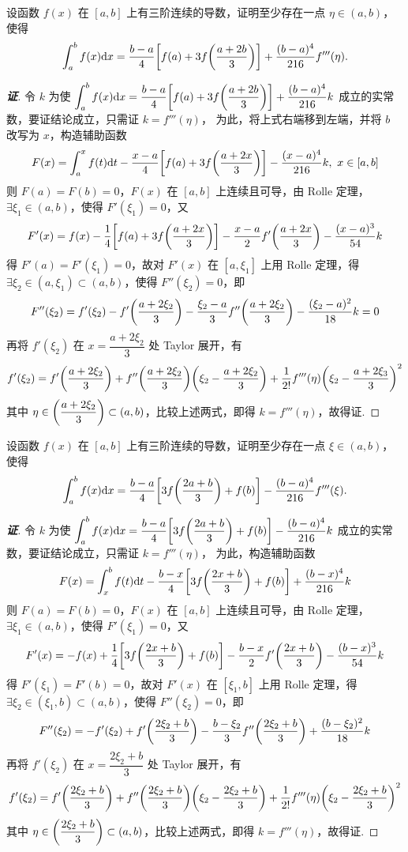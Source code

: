 \begin{example}
    设函数 $f(x)$ 在 $[a,b]$ 上有三阶连续的导数，证明至少存在一点 $\eta\in(a,b)$，使得
    $$\int_{a}^{b}f(x)\dd x=\dfrac{b-a}{4}\qty[f(a)+3f\qty(\dfrac{a+2b}{3})]+\dfrac{(b-a)^4}{216}f'''(\eta).$$
\end{example}
\begin{proof}[{\songti \textbf{证}}]
    令 $k$ 为使 $\displaystyle\int_{a}^{b}f(x)\dd x=\dfrac{b-a}{4}\qty[f(a)+3f\qty(\dfrac{a+2b}{3})]+\dfrac{(b-a)^4}{216}k$ 成立的实常数，要证结论成立，只需证 $k=f'''(\eta)$，
    为此，将上式右端移到左端，并将 $b$ 改写为 $x$，构造辅助函数
    $$F(x)=\int_{a}^{x}f(t)\dd t-\dfrac{x-a}{4}\qty[f(a)+3f\qty(\dfrac{a+2x}{3})]-\dfrac{(x-a)^4}{216}k,~x\in[a,b]$$
    则 $F(a)=F(b)=0$，$F(x)$ 在 $[a,b]$ 上连续且可导，由 Rolle 定理，$\exists\xi_1\in(a,b)$，使得 $F'(\xi_1)=0$，又
    $$F'(x)=f(x)-\dfrac{1}{4}\qty[f(a)+3f\qty(\dfrac{a+2x}{3})]-\dfrac{x-a}{2}f'\qty(\dfrac{a+2x}{3})-\dfrac{(x-a)^3}{54}k$$
    得 $F'(a)=F'(\xi_1)=0$，故对 $F'(x)$ 在 $[a,\xi_1]$ 上用 Rolle 定理，得 $\exists\xi_2\in(a,\xi_1)\subset(a,b)$，使得 $F''(\xi_2)=0$，即
    $$F''(\xi_2)=f'(\xi_2)-f'\qty(\dfrac{a+2\xi_2}{3})-\dfrac{\xi_2-a}{3}f''\qty(\dfrac{a+2\xi_2}{3})-\dfrac{(\xi_2-a)^2}{18}k=0$$
    再将 $f'(\xi_2)$ 在 $x=\dfrac{a+2\xi_2}{3}$ 处 Taylor 展开，有
    $$f'(\xi_2)=f'\qty(\dfrac{a+2\xi_2}{3})+f''\qty(\dfrac{a+2\xi_2}{3})\qty(\xi_2-\dfrac{a+2\xi_2}{3})+\dfrac{1}{2!}f'''(\eta)\qty(\xi_2-\dfrac{a+2\xi_3}{3})^2$$
    其中 $\eta\in\qty(\dfrac{a+2\xi_2}{3})\subset(a,b)$，比较上述两式，即得 $k=f'''(\eta)$，故得证.
\end{proof}

\begin{example}
    设函数 $f(x)$ 在 $[a,b]$ 上有三阶连续的导数，证明至少存在一点 $\xi\in(a,b)$，使得
    $$\int_{a}^{b}f(x)\dd x=\dfrac{b-a}{4}\qty[3f\qty(\dfrac{2a+b}{3})+f(b)]-\dfrac{(b-a)^4}{216}f'''(\xi).$$
\end{example}
\begin{proof}[{\songti \textbf{证}}]
    令 $k$ 为使 $\displaystyle \int_{a}^{b}f(x)\dd x=\dfrac{b-a}{4}\qty[3f\qty(\dfrac{2a+b}{3})+f(b)]-\dfrac{(b-a)^4}{216}k$ 成立的实常数，要证结论成立，只需证 $k=f'''(\eta)$，
    为此，构造辅助函数 $$F(x)=\int_{x}^{b}f(t)\dd t-\dfrac{b-x}{4}\qty[3f\qty(\dfrac{2x+b}{3})+f(b)]+\dfrac{(b-x)^4}{216}k$$
    则 $F(a)=F(b)=0$，$F(x)$ 在 $[a,b]$ 上连续且可导，由 Rolle 定理，$\exists\xi_1\in(a,b)$，使得 $F'(\xi_1)=0$，又
    $$F'(x)=-f(x)+\dfrac{1}{4}\qty[3f\qty(\dfrac{2x+b}{3})+f(b)]-\dfrac{b-x}{2}f'\qty(\dfrac{2x+b}{3})-\dfrac{(b-x)^3}{54}k$$
    得 $F'(\xi_1)=F'(b)=0$，故对 $F'(x)$ 在 $[\xi_1,b]$ 上用 Rolle 定理，得 $\exists\xi_2\in(\xi_1,b)\subset(a,b)$，使得 $F''(\xi_2)=0$，即
    $$F''(\xi_2)=-f'(\xi_2)+f'\qty(\dfrac{2\xi_2+b}{3})-\dfrac{b-\xi_2}{3}f''\qty(\dfrac{2\xi_2+b}{3})+\dfrac{(b-\xi_2)^2}{18}k$$
    再将 $f'(\xi_2)$ 在 $x=\dfrac{2\xi_2+b}{3}$ 处 Taylor 展开，有
    $$f'(\xi_2)=f'\qty(\dfrac{2\xi_2+b}{3})+f''\qty(\dfrac{2\xi_2+b}{3})\qty(\xi_2-\dfrac{2\xi_2+b}{3})+\dfrac{1}{2!}f'''(\eta)\qty(\xi_2-\dfrac{2\xi_2+b}{3})^2$$
    其中 $\eta\in\qty(\dfrac{2\xi_2+b}{3})\subset(a,b)$，比较上述两式，即得 $k=f'''(\eta)$，故得证.
\end{proof}


